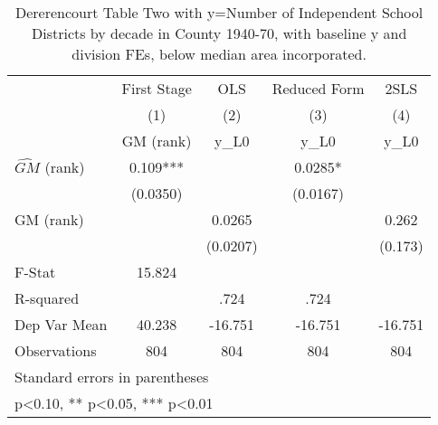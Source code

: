 \begin{table}[htbp]\centering
\def\sym#1{\ifmmode^{#1}\else\(^{#1}\)\fi}
\caption{Dererencourt Table Two with y=Number of Independent School Districts by decade in County 1940-70, with baseline y and division FEs, below median area incorporated.}
\begin{tabular}{l*{4}{c}}
\toprule
                    & First Stage   &         OLS   &Reduced Form   &        2SLS   \\
                    &\multicolumn{1}{c}{(1)}&\multicolumn{1}{c}{(2)}&\multicolumn{1}{c}{(3)}&\multicolumn{1}{c}{(4)}\\
                    &\multicolumn{1}{c}{GM  (rank)}&\multicolumn{1}{c}{y\_L0}&\multicolumn{1}{c}{y\_L0}&\multicolumn{1}{c}{y\_L0}\\
\midrule
$\hat{GM}$ (rank)   &       0.109***&               &      0.0285*  &               \\
                    &    (0.0350)   &               &    (0.0167)   &               \\
\addlinespace
GM  (rank)          &               &      0.0265   &               &       0.262   \\
                    &               &    (0.0207)   &               &     (0.173)   \\
\midrule
F-Stat              &      15.824   &               &               &               \\
R-squared           &               &        .724   &        .724   &               \\
Dep Var Mean        &      40.238   &     -16.751   &     -16.751   &     -16.751   \\
Observations        &         804   &         804   &         804   &         804   \\
\bottomrule
\multicolumn{5}{l}{\footnotesize Standard errors in parentheses}\\
\multicolumn{5}{l}{\footnotesize * p<0.10, ** p<0.05, *** p<0.01}\\
\end{tabular}
\end{table}
